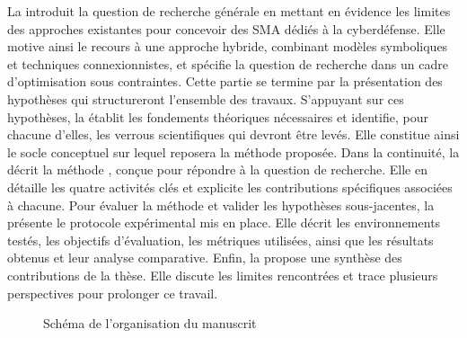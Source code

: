 \noindent
La  introduit la question de recherche générale en mettant en évidence les limites des approches existantes pour concevoir des SMA dédiés à la cyberdéfense. Elle motive ainsi le recours à une approche hybride, combinant modèles symboliques et techniques connexionnistes, et spécifie la question de recherche dans un cadre d’optimisation sous contraintes. Cette partie se termine par la présentation des hypothèses qui structureront l’ensemble des travaux.
%
S’appuyant sur ces hypothèses, la  établit les fondements théoriques nécessaires et identifie, pour chacune d’elles, les verrous scientifiques qui devront être levés. Elle constitue ainsi le socle conceptuel sur lequel reposera la méthode proposée.
%
Dans la continuité, la  décrit la méthode , conçue pour répondre à la question de recherche. Elle en détaille les quatre activités clés et explicite les contributions spécifiques associées à chacune.
%
Pour évaluer la méthode et valider les hypothèses sous-jacentes, la  présente le protocole expérimental mis en place. Elle décrit les environnements testés, les objectifs d’évaluation, les métriques utilisées, ainsi que les résultats obtenus et leur analyse comparative.
%
Enfin, la  propose une synthèse des contributions de la thèse. Elle discute les limites rencontrées et trace plusieurs perspectives pour prolonger ce travail.
%
\begin{figure}[H]
  \centering
  \resizebox{0.8\textwidth}{!}{%
    
  }
  \caption{Schéma de l'organisation du manuscrit}
  \label{fig:organisation_manuscrit}
\end{figure}


\cleardoublepage
